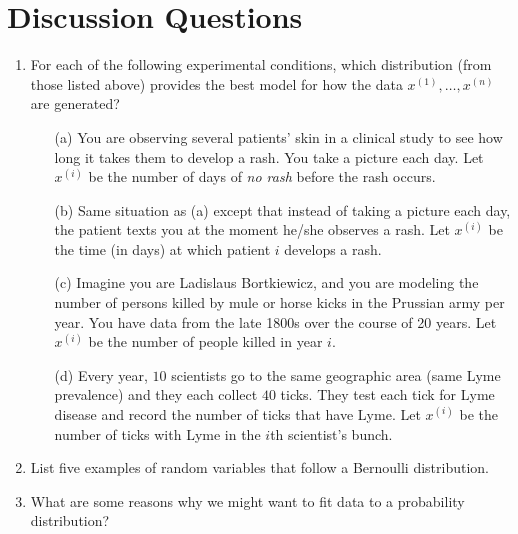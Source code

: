 \section{Discussion Questions}

\begin{enumerate}
\item For each of the following experimental conditions, which distribution (from those listed above) provides the best model for how the data $x^{(1)},\dots,x^{(n)}$ are generated?
    \begin{enumerate}
    \item[(a)] You are observing several patients' skin in a clinical study to see how long it takes them to develop a rash. You take a picture each day. Let $x^{(i)}$ be the number of days of \emph{no rash} before the rash occurs.
    \item[(b)] Same situation as (a) except that instead of taking a picture each day, the patient texts you at the moment he/she observes a rash. Let $x^{(i)}$ be the time (in days) at which patient $i$ develops a rash.
    \item[(c)] Imagine you are Ladislaus Bortkiewicz, and you are modeling the number of persons killed by mule or horse kicks in the Prussian army per year. You have data from the late 1800s over the course of 20 years. Let $x^{(i)}$ be the number of people killed in year $i$.
    \item[(d)] Every year, $10$ scientists go to the same geographic area (same Lyme prevalence) and they each collect $40$ ticks. They test each tick for Lyme disease and record the number of ticks that have Lyme. Let $x^{(i)}$ be the number of ticks with Lyme in the $i$th scientist's bunch.
    \end{enumerate}
\item List five examples of random variables that follow a Bernoulli distribution.
\item What are some reasons why we might want to fit data to a probability distribution?
\end{enumerate}
